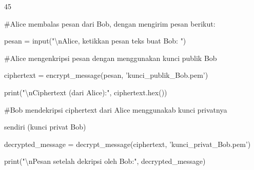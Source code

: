 \documentclass{article}
\begin{document}

45

\#Alice membalas pesan dari Bob, dengan mengirim pesan berikut:

pesan = input("\textbackslash{}nAlice, ketikkan pesan teks buat Bob: ")

\#Alice mengenkripsi pesan dengan menggunakan kunci publik Bob

ciphertext = encrypt\_message(pesan, 'kunci\_publik\_Bob.pem')

print("\textbackslash{}nCiphertext (dari Alice):", ciphertext.hex())

\#Bob mendekripsi ciphertext dari Alice menggunakab kunci privatnya 

sendiri (kunci privat Bob)

decrypted\_message = decrypt\_message(ciphertext, 'kunci\_privat\_Bob.pem')

print("\textbackslash{}nPesan setelah dekripsi oleh Bob:", decrypted\_message)
\end{document}
